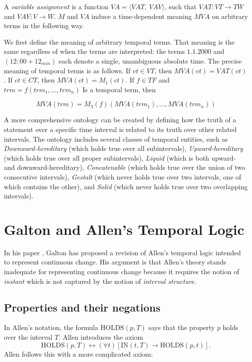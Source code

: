 A \textit{variable assignment} is a function $ VA = \langle VAT,\ VAV \rangle$, such that $VAT: VT \to TW$ and
$VAV: V \to W$. $M$ and $VA$ induce a time-dependent meaning $MVA$ on arbitrary terms in the following way.

We first define the meaning of arbitrary temporal terms. That meaning is the same regardless of when the terms are interpreted: the terms $1.1.2000$ and
$(12:00 + 12_{min})$ each denote a single, unambiguous absolute time. The precise
meaning of temporal terms is as follows. If $vt \in VT $, then $MVA (vt) = VAT (vt)$.
If $ct \in CT$, then $MVA (ct) = M_1(ct)$. If $f \in T F$ and $trm = f(trm_1, . . . , trm_n)$ Is a
temporal term, then

\[
	MVA(trm) = M_3(f)(MVA(trm_1), \dots, MVA(trm_n))
\]

A more comprehensive ontology can be created by defining how the truth of a statement over a specific time interval is related to its truth over other related intervals.
The ontology includes several classes of temporal entities, such as \textit{Downward-hereditary} (which holds true over all subintervals), \textit{Upward-hereditary} (which holds true over all proper subintervals), \textit{Liquid} (which is both upward- and downward-hereditary), \textit{Concatenable} (which holds true over the union of two consecutive intervals),
\textit{Gestalt} (which never holds true over two intervals, one of which contains the other), and \textit{Solid} (which never holds true over two overlapping intervals).



\section{Galton and Allen's Temporal Logic}
In his paper \cite{galton2004}, Galton has proposed a revision of Allen's temporal logic intended to represent continuous change.
His argument is that Allen's theory stands inadequate for representing continuous change because it requires the notion of \textit{instant} which is not captured by the notion of \textit{interval structure}.

\subsection{Properties and their negations}
In Allen's notation, the formula $\text{HOLDS}(p, T)$ says that the property $p$ holds over the interval $T$.
Allen introduces the axiom
\begin{equation}
	\text{HOLDS}(p, T) \leftrightarrow (\forall t) [\text{IN}(t, T) \to \text{HOLDS}(p, t)].
\end{equation}
Allen follows this with a more complicated axiom:

